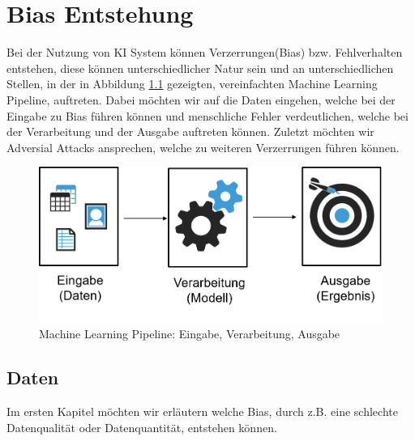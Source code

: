 \documentclass[12pt,oneside,a4paper,parskip]{scrbook}
\begin{document}

\chapter{Bias Entstehung}
Bei der Nutzung von KI System können Verzerrungen(Bias) bzw. Fehlverhalten entstehen, diese können unterschiedlicher Natur sein und an unterschiedlichen Stellen, in der in Abbildung \ref{fig:dataBias} gezeigten, vereinfachten Machine Learning Pipeline, auftreten. Dabei möchten wir auf die Daten eingehen, welche bei der Eingabe zu Bias führen können und menschliche Fehler verdeutlichen, welche bei der Verarbeitung und der Ausgabe auftreten können. Zuletzt möchten wir Adversial Attacks ansprechen, welche zu weiteren Verzerrungen führen können.

\begin{figure}[h]
	\begin{center}
		\includegraphics[width=15cm]{Bilder/data_bias.png}
		\caption{Machine Learning Pipeline: Eingabe, Verarbeitung, Ausgabe}
		\label{fig:dataBias}
	\end{center}
\end{figure}

\section{Daten}
\label{section:data}
Im ersten Kapitel möchten wir erläutern welche Bias, durch z.B. eine schlechte Datenqualität oder Datenquantität, entstehen können.
\end{document}
